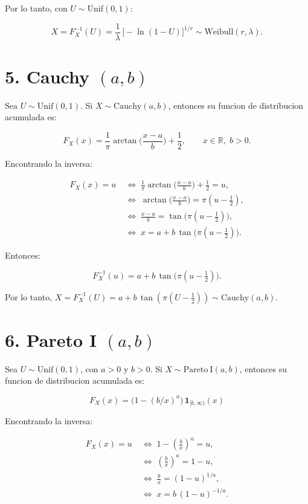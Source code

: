 \documentclass[10pt,a4paper]{article}
\let\oldsection\section
\renewcommand{\section}{%
      \clearpage
      \thispagestyle{myfancy}%
      \oldsection
    }
\begin{document}
Por lo tanto, con \(U\sim\mathrm{Unif}(0,1)\):

\[
X=F_X^{-1}(U)=\frac{1}{\lambda}\,\bigl[-\ln(1-U)\bigr]^{1/r}\sim\mathrm{Weibull}(r,\lambda).
\]

    \hypertarget{cauchy-ab}{%
\section{\texorpdfstring{5. Cauchy
\((a,b)\)}{5. Cauchy (a,b)}}\label{cauchy-ab}}

    Sea \textbf{\(U\sim\mathrm{Unif}(0,1)\)}. Si
\(X\sim\mathrm{Cauchy}(a,b)\), entonces su funcion de distribucion
acumulada es:

\[
F_X(x)=\frac{1}{\pi}\arctan\!\Big(\frac{x-a}{b}\Big)+\frac{1}{2},\qquad x\in\mathbb{R},\; b>0.
\]

Encontrando la inversa:

\[
\begin{aligned}
F_X(x)=u 
&\;\iff\; \frac{1}{\pi}\arctan\!\Big(\frac{x-a}{b}\Big)+\frac{1}{2}=u,\\
&\;\iff\; \arctan\!\Big(\frac{x-a}{b}\Big)=\pi\!\left(u-\tfrac{1}{2}\right),\\
&\;\iff\; \frac{x-a}{b}=\tan\!\big(\pi(u-\tfrac{1}{2})\big),\\
&\;\iff\; x=a+b\,\tan\!\big(\pi(u-\tfrac{1}{2})\big).
\end{aligned}
\]

Entonces:

\[
F_X^{-1}(u)=a+b\,\tan\!\big(\pi(u-\tfrac{1}{2})\big).
\]

Por lo tanto,
\(X=F_X^{-1}(U)=a+b\,\tan(\pi(U-\tfrac{1}{2}))\sim\mathrm{Cauchy}(a,b)\).

    \hypertarget{pareto-i-ab}{%
\section{\texorpdfstring{6. Pareto I
\((a,b)\)}{6. Pareto I (a,b)}}\label{pareto-i-ab}}

    Sea \textbf{\(U\sim\mathrm{Unif}(0,1)\)}, con \(a>0\) y \(b>0\). Si
\(X\sim\mathrm{Pareto\ I}(a,b)\), entonces su funcion de distribucion
acumulada es:

\[
F_X(x)=\bigl(1-(b/x)^a\bigr)\,\mathbf{1}_{[b,\infty)}(x)
\]

Encontrando la inversa:

\[
\begin{aligned}
F_X(x)=u &\;\iff\; 1-\left(\frac{b}{x}\right)^a=u,\\
         &\;\iff\; \left(\frac{b}{x}\right)^a=1-u,\\
         &\;\iff\; \frac{b}{x}=(1-u)^{1/a},\\
         &\;\iff\; x=b\,(1-u)^{-1/a}.
\end{aligned}
\]
\end{document}
